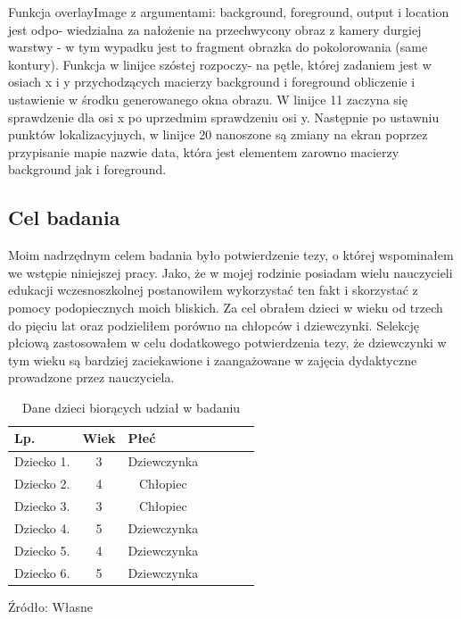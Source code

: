 \documentclass{article}
\begin{document}
	Funkcja overlayImage z argumentami: background, foreground, output i location jest odpo- wiedzialna za nałożenie na przechwycony obraz z kamery durgiej warstwy - w tym wypadku jest to fragment obrazka do pokolorowania (same kontury).
	Funkcja w linijce szóstej rozpoczy- na pętle, której zadaniem jest w osiach x i y przychodzących macierzy background i foreground obliczenie i ustawienie w środku generowanego okna obrazu. W linijce 11 zaczyna się sprawdzenie dla osi x po uprzedmim sprawdzeniu osi y. Następnie po ustawniu punktów lokalizacyjnych, w linijce 20 nanoszone są zmiany na ekran poprzez przypisanie mapie nazwie data, która jest elementem zarowno macierzy background jak i foreground.
	\newpage
	\subsection{Cel badania}
	\par
	Moim nadrzędnym celem badania było potwierdzenie tezy, o której wspominałem we wstępie niniejszej pracy. Jako, że w mojej rodzinie posiadam wielu nauczycieli edukacji wczesnoszkolnej postanowiłem wykorzystać ten fakt i skorzystać z pomocy podopiecznych moich bliskich. Za cel obrałem dzieci w wieku od trzech do pięciu lat oraz podzieliłem porówno na chłopców i dziewczynki. Selekcję płciową zastosowałem w celu dodatkowego potwierdzenia tezy, że dziewczynki w tym wieku są bardziej zaciekawione i zaangażowane w zajęcia dydaktyczne prowadzone przez nauczyciela.
	
\begin{table}[h!]
	\centering
	\begin{tabular}{|c|c|c|c|c|c|c|}
		\hline
		\multicolumn{1}{|l|}{Lp.} & \multicolumn{1}{l|}{Wiek} & \multicolumn{1}{l|}{Płeć}  \\ \hline
		Dziecko 1.                & 3                              & Dziewczynka                                          \\ \hline
		Dziecko 2.                & 4                              & Chłopiec                                       \\ \hline
		Dziecko 3.                & 3                              & Chłopiec                                              \\ \hline
		Dziecko 4.                & 5                              & Dziewczynka                                          \\ \hline
		Dziecko 5.                & 4                              & Dziewczynka                                            \\ \hline
		Dziecko 6.                & 5                              & Dziewczynka                                               \\ \hline
	\end{tabular}
	\caption{Dane dzieci biorących udział w badaniu}
	Źródło: Własne
\end{table}
	
\end{document}
